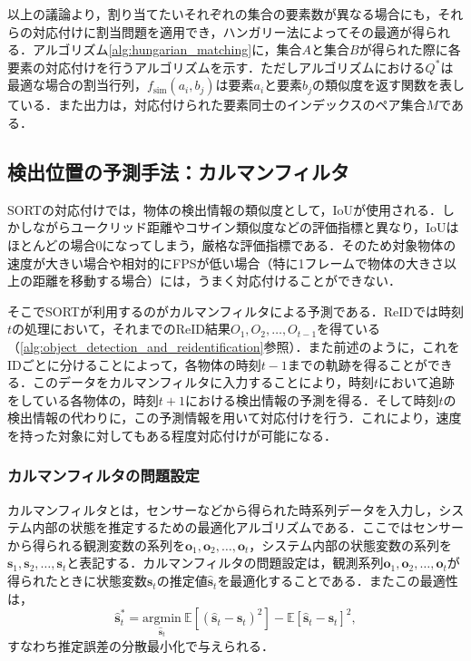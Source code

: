     以上の議論より，割り当てたいそれぞれの集合の要素数が異なる場合にも，それらの対応付けに割当問題を適用でき，ハンガリー法によってその最適が得られる．アルゴリズム\ref{alg:hungarian_matching}に，集合$A$と集合$B$が得られた際に各要素の対応付けを行うアルゴリズムを示す．ただしアルゴリズムにおける$Q^*$は最適な場合の割当行列，$f_{\text{sim}}(a_i, b_j)$は要素$a_i$と要素$b_j$の類似度を返す関数を表している．また出力は，対応付けられた要素同士のインデックスのペア集合$M$である．

    \subsection{検出位置の予測手法：カルマンフィルタ}
    \label{subsec:kalman_filter}

    SORT\cite{bewley2016simple}の対応付けでは，物体の検出情報の類似度として，IoUが使用される．しかしながらユークリッド距離やコサイン類似度などの評価指標と異なり，IoUはほとんどの場合$0$になってしまう，厳格な評価指標である．そのため対象物体の速度が大きい場合や相対的にFPSが低い場合（特に1フレームで物体の大きさ以上の距離を移動する場合）には，うまく対応付けることができない．

    そこでSORTが利用するのがカルマンフィルタによる予測である．ReIDでは時刻$t$の処理において，それまでのReID結果$O_1, O_2, \dots, O_{t-1}$を得ている（\ref{alg:object_detection_and_reidentification}参照）．また前述のように，これをIDごとに分けることによって，各物体の時刻$t-1$までの軌跡を得ることができる．このデータをカルマンフィルタに入力することにより，時刻$t$において追跡をしている各物体の，時刻$t+1$における検出情報の予測を得る．そして時刻$t$の検出情報の代わりに，この予測情報を用いて対応付けを行う．これにより，速度を持った対象に対してもある程度対応付けが可能になる．

    \subsubsection{カルマンフィルタの問題設定}
    \label{subsubsec:kalmanfilter_setting}

    カルマンフィルタ\cite{bishop2001introduction}とは，センサーなどから得られた時系列データを入力し，システム内部の状態を推定するための最適化アルゴリズムである．ここではセンサーから得られる観測変数の系列を$\bm{o}_1, \bm{o}_2, \dots, \bm{o}_t$，システム内部の状態変数の系列を$\bm{s}_1, \bm{s}_2, \dots, \bm{s}_t$と表記する．カルマンフィルタの問題設定は，観測系列$\bm{o}_1, \bm{o}_2, \dots, \bm{o}_t$が得られたときに状態変数$\bm{s}_t$の推定値$\hat{\bm{s}}_t$を最適化することである．またこの最適性は，
    \begin{equation}
        \label{eq:kalman_optimality}
        \hat{\bm{s}}_t^* = \underset{\hat{\bm{s}}_t}{\text{argmin}} ~ \mathbb{E}\left[\left(\hat{\bm{s}}_t - \bm{s}_t\right)^2\right] - \mathbb{E}\left[\hat{\bm{s}}_t - \bm{s}_t\right]^2,
    \end{equation}
    すなわち推定誤差の分散最小化で与えられる．

